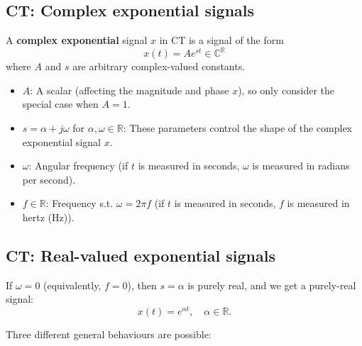 \subsection{CT: Complex exponential signals}
    \begin{definition}
        A \textbf{complex exponential} signal \(x\) in CT is a signal of the form
        \begin{equation}
            x(t) = A e^{st} \in \mathbb{C}^\mathbb{R}
        \end{equation}
        where \(A\) and \(s\) are arbitrary complex-valued constants.

        \begin{itemize}
            \item \(A\): A scalar (affecting the magnitude and phase \(x\)), so only consider the special case when \(A = 1\).
            \item \(s = \alpha + j\omega\) for \(\alpha, \omega \in \mathbb{R}\): These parameters control the shape of the complex exponential signal \(x\).
            \item \(\omega\): Angular frequency (if \(t\) is measured in seconds, \(\omega\) is measured in radians per second).
            \item \(f \in \mathbb{R}\): Frequency s.t. \(\omega = 2 \pi f\) (if \(t\) is measured in seconds, \(f\) is measured in hertz (Hz)).
        \end{itemize}
    \end{definition}


\subsection{CT: Real-valued exponential signals}
\begin{definition}
    If \(\omega = 0\) (equivalently, \(f = 0\)), then \(s = \alpha\) is purely real, and we get a purely-real signal:
    \begin{equation}
    x(t) = e^{\alpha t}, \quad \alpha \in \mathbb{R}.
    \end{equation}

    Three different general behaviours are possible:
\end{definition}

